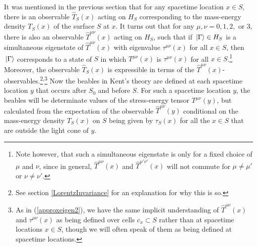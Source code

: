 It was mentioned in the previous section that for any spacetime location $x\in S$,  there is an observable $\hat{T}_S(x)$ acting on $H_S$ corresponding to the mass-energy density $T_S(x)$ of the surface $S$ at $x$. It turns out that for any $\mu, \nu=0,1,2,$ or $3$, there is also an observable  $\hat{T}^{\mu\nu}(x)$ acting  %
%
 on $H_S$, such that if $\ket*{\Gamma}\in H_S$ is a simultaneous eigenstate of $\hat{T}^{\mu\nu}(x)$ with eigenvalue $\tau^{\mu\nu}(x)$ for  %
%
 all $x\in S$, then $\ket*{\Gamma}$ corresponds to a state of $S$ in which $T^{\mu\nu}(x)$ is  $\tau^{\mu\nu}(x)$ for all $x\in S$.\footnote{Note however, that such a simultaneous eigenstate is only for a fixed choice of $\mu$ and $\nu$, since in general, $\hat{T}^{\mu\nu}(x)$ and $\hat{T}^{\mu'\nu'}(x)$ will not commute for $\mu\neq\mu'$ or $\nu\neq\nu'$. } Moreover, the observable $\hat{T}_S(x)$ is expressible in terms of the  $\hat{T}^{\mu\nu}(x)$-observables.\footnote{See section  \ref{LorentzInvariance} for an explanation for why this is so.}\textsuperscript{,}\footnote{As in (\ref{approxeigen2}), we have the same implicit understanding of $\hat{T}^{\mu\nu}(x)$ and $\tau^{\mu\nu}(x)$ as being defined over cells $c_x\subset S$ rather than at spacetime locations $x\in S$, though we will often speak of them as being defined at spacetime locations. }
Now the  beables in Kent's theory are defined at each spacetime location $y$ that occurs after $S_0$ and before $S$. For such a spacetime location $y$, the beables will be determinate values of the stress-energy tensor $T^{\mu\nu}(y)$, but calculated from the expectation of the observable $\hat{T}^{\mu\nu}(y)$ conditional on the mass-energy density $T_S(x)$ on $S$ being given by $\tau_S(x)$ for all the $x\in S$ that are outside the light cone of $y$. 

